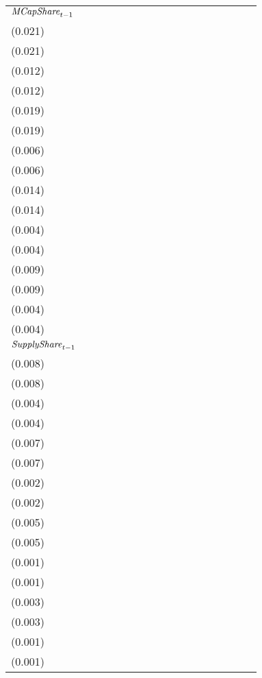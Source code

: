 \begin{tabular}{lllllllllllllllll}
${{\it MCapShare}}_{t-1}$    &   \makecell{$0.157^{**}$ \\(0.021)} &   \makecell{$0.159^{**}$ \\(0.021)} &     \makecell{$0.019^{}$ \\(0.012)} &    \makecell{$0.019^{}$ \\(0.012)} &   \makecell{$1.497^{**}$ \\(0.019)} &   \makecell{$1.498^{**}$ \\(0.019)} &   \makecell{$0.061^{**}$ \\(0.006)} &   \makecell{$0.061^{**}$ \\(0.006)} &   \makecell{$1.166^{**}$ \\(0.014)} &   \makecell{$1.167^{**}$ \\(0.014)} &   \makecell{$0.048^{**}$ \\(0.004)} &   \makecell{$0.048^{**}$ \\(0.004)} &   \makecell{$0.464^{**}$ \\(0.009)} &  \makecell{$0.464^{**}$ \\(0.009)} &  \makecell{$0.047^{**}$ \\(0.004)} &  \makecell{$0.047^{**}$ \\(0.004)} \\
${{\it SupplyShare}}_{t-1}$  &   \makecell{$0.211^{**}$ \\(0.008)} &   \makecell{$0.210^{**}$ \\(0.008)} &   \makecell{$0.038^{**}$ \\(0.004)} &  \makecell{$0.038^{**}$ \\(0.004)} &   \makecell{$0.224^{**}$ \\(0.007)} &   \makecell{$0.224^{**}$ \\(0.007)} &   \makecell{$0.008^{**}$ \\(0.002)} &   \makecell{$0.008^{**}$ \\(0.002)} &   \makecell{$0.161^{**}$ \\(0.005)} &   \makecell{$0.161^{**}$ \\(0.005)} &   \makecell{$0.005^{**}$ \\(0.001)} &   \makecell{$0.005^{**}$ \\(0.001)} &   \makecell{$0.123^{**}$ \\(0.003)} &  \makecell{$0.123^{**}$ \\(0.003)} &  \makecell{$0.014^{**}$ \\(0.001)} &  \makecell{$0.014^{**}$ \\(0.001)} \\

\end{tabular}
